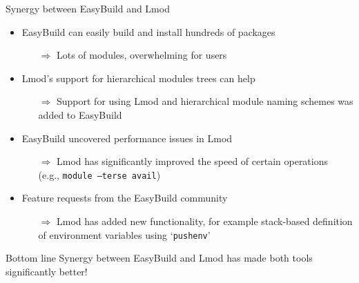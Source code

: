 \documentclass[10pt,xcolor={usenames,dvipsnames}]{beamer}
\begin{document}

\begin{frame}{Synergy between EasyBuild and Lmod}
\begin{itemize}
    \item
        EasyBuild can easily build and install hundreds of packages
        \begin{itemize}
            \item[$\Rightarrow$]
                Lots of modules, overwhelming for users
        \end{itemize}
    \item
        Lmod's support for hierarchical modules trees can help
        \begin{itemize}
            \item[$\Rightarrow$]
                Support for using Lmod and hierarchical module naming schemes
                was added to EasyBuild
        \end{itemize}
    \item
        EasyBuild uncovered performance issues in Lmod
        \begin{itemize}
            \item[$\Rightarrow$]
                Lmod has significantly improved the speed of certain operations \\
                (e.g., \texttt{module --terse avail})
        \end{itemize}
    \item
        Feature requests from the EasyBuild community
        \begin{itemize}
            \item[$\Rightarrow$]
                Lmod has added new functionality, for example stack-based definition of
                environment variables using `\texttt{pushenv}'
        \end{itemize}
\end{itemize}

\medskip\quad\quad
\begin{minipage}{0.9\textwidth}
    \begin{block}{\small Bottom line}
        \footnotesize
        Synergy between EasyBuild and Lmod has made both tools significantly better!
    \end{block}
\end{minipage}
\end{frame}

\end{document}

